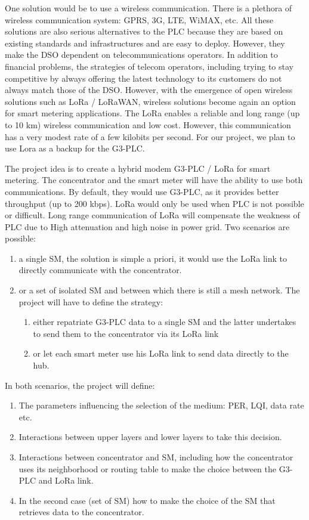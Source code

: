 \documentclass[a4paper,10pt]{article}
\begin{document}
One solution would be to use a wireless communication. There
is a plethora of wireless communication system: GPRS, 3G,
LTE, WiMAX, etc. All these solutions are also serious
alternatives to the PLC because they are based on existing
standards and infrastructures and are easy to
deploy. However, they make the DSO dependent on
telecommunications operators. In addition to financial
problems, the strategies of telecom operators, including
trying to stay competitive by always offering the latest
technology to its customers do not always match those of the
DSO. However, with the emergence of open wireless solutions
such as LoRa / LoRaWAN, wireless solutions become again an
option for smart metering applications. The LoRa enables a
reliable and long range (up to 10 km) wireless communication
and low cost. However, this communication has a very modest
rate of a few kilobits per second. For our project, we plan
to use Lora as a backup for the G3-PLC.

The project idea is to create a hybrid modem G3-PLC / LoRa
for smart metering. The concentrator and the smart meter
will have the ability to use both communications. By default, 
they would use G3-PLC, as it provides better throughput (up 
to 200 kbps). LoRa would only be used when PLC is not possible
or difficult. Long range communication of LoRa will compensate 
the weakness of PLC due to High attenuation and high noise in
power grid. Two scenarios are possible:

\begin{enumerate}
  \item a single SM, the solution is simple a priori, it would use the LoRa link to directly communicate with the concentrator.
  \item or a set of isolated SM and between which there is still a mesh network. The project will have to define the strategy:
    \begin{enumerate}
      \item either repatriate G3-PLC data to a single SM and the latter undertakes to send them to the concentrator via its LoRa link
      \item or let each smart meter use his LoRa link to send data directly to the hub.
    \end{enumerate}
\end{enumerate}

In both scenarios, the project will define:

\begin{enumerate}
\item The parameters influencing the selection of the medium: PER, LQI, data rate etc.
\item Interactions between upper layers and lower layers to take this decision.
\item Interactions between concentrator and SM, including how the concentrator uses its neighborhood or routing table to make the choice between the G3-PLC and LoRa link.
\item In the second case (set of SM) how to make the choice of the SM that retrieves data to the concentrator.
\end{enumerate}
\end{document}
